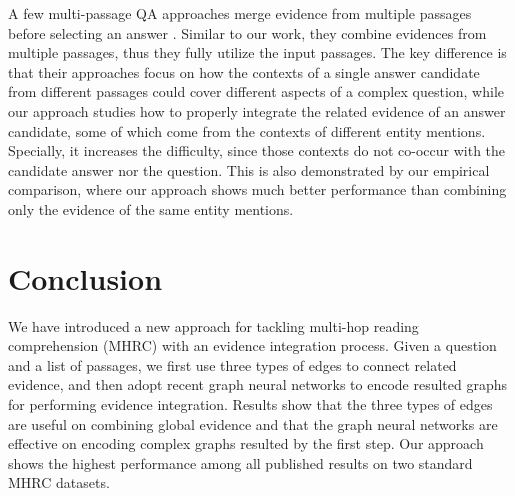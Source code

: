 \documentclass[letterpaper]{article}
\begin{document}
A few multi-passage QA approaches merge evidence from multiple passages before selecting an answer \citep{wang2018evidence,lin2018denoising,wang2018joint}.
Similar to our work, they combine evidences from multiple passages, thus they fully utilize the input passages.
The key difference is that their approaches focus on how the contexts of a single answer candidate from different passages could cover different aspects of a complex question, while our approach studies how to properly integrate the related evidence of an answer candidate, some of which come from the contexts of different entity mentions.
Specially, it increases the difficulty, since those contexts do not co-occur with the candidate answer nor the question.
This is also demonstrated by our empirical comparison, where our approach shows much better performance than combining only the evidence of the same entity mentions.

\section{Conclusion}

We have introduced a new approach for tackling multi-hop reading comprehension (MHRC) with an evidence integration process.
Given a question and a list of passages, we first use three types of edges to connect related evidence, and then adopt recent graph neural networks to encode resulted graphs for performing evidence integration.
Results show that the three types of edges are useful on combining global evidence and that the graph neural networks are effective on encoding complex graphs resulted by the first step.
Our approach shows the highest performance among all published results on two standard MHRC datasets.



\end{document}
